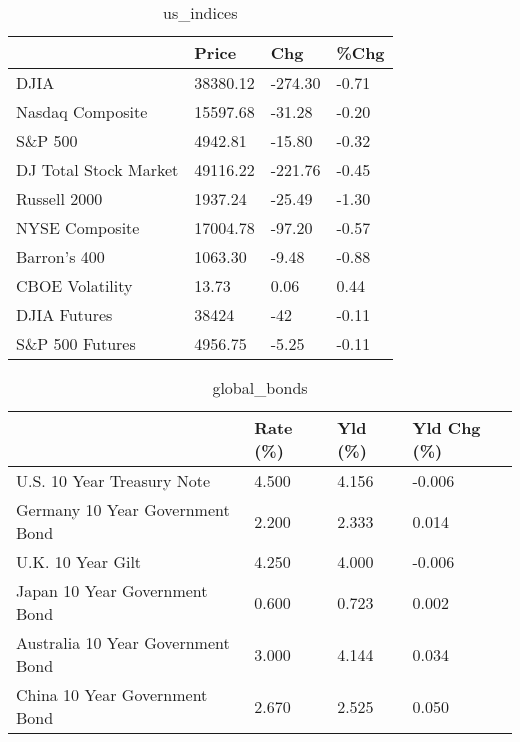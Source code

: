 \documentclass{article}%
\begin{document}
%


\begin{table}[htbp]%
\caption{us\_indices}%
\centering%
\begin{adjustbox}{width=1\textwidth}%
\begin{tabular}{llll}
\toprule
                      &    Price &     Chg &  \%Chg \\
\midrule
                 DJIA & 38380.12 & -274.30 & -0.71 \\
     Nasdaq Composite & 15597.68 &  -31.28 & -0.20 \\
              S\&P 500 &  4942.81 &  -15.80 & -0.32 \\
DJ Total Stock Market & 49116.22 & -221.76 & -0.45 \\
         Russell 2000 &  1937.24 &  -25.49 & -1.30 \\
       NYSE Composite & 17004.78 &  -97.20 & -0.57 \\
         Barron's 400 &  1063.30 &   -9.48 & -0.88 \\
      CBOE Volatility &    13.73 &    0.06 &  0.44 \\
         DJIA Futures &    38424 &     -42 & -0.11 \\
      S\&P 500 Futures &  4956.75 &   -5.25 & -0.11 \\
\bottomrule
\end{tabular}
%
\end{adjustbox}%
\end{table}

%


\begin{table}[htbp]%
\caption{global\_bonds}%
\centering%
\begin{adjustbox}{width=1\textwidth}%
\begin{tabular}{llll}
\toprule
                                  & Rate (\%) & Yld (\%) & Yld Chg (\%) \\
\midrule
       U.S. 10 Year Treasury Note &    4.500 &   4.156 &      -0.006 \\
  Germany 10 Year Government Bond &    2.200 &   2.333 &       0.014 \\
                U.K. 10 Year Gilt &    4.250 &   4.000 &      -0.006 \\
    Japan 10 Year Government Bond &    0.600 &   0.723 &       0.002 \\
Australia 10 Year Government Bond &    3.000 &   4.144 &       0.034 \\
    China 10 Year Government Bond &    2.670 &   2.525 &       0.050 \\
\bottomrule
\end{tabular}
%
\end{adjustbox}%
\end{table}
\end{document}

